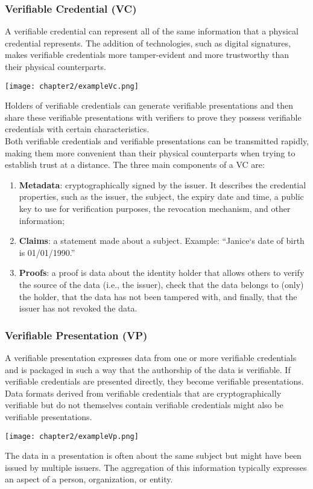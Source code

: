 \subsubsection{Verifiable Credential (VC)}
A verifiable credential can represent all of the same information that a physical 
credential represents. The addition of technologies, such as digital signatures, 
makes verifiable credentials more tamper-evident and more trustworthy than their 
physical counterparts.\\
\begin{center}
    \vspace*{-0.5cm}
    \texttt{[image: chapter2/exampleVc.png]}
\end{center}
Holders of verifiable credentials can generate verifiable presentations and then share 
these verifiable presentations with verifiers to prove they possess verifiable 
credentials with certain characteristics.\\
Both verifiable credentials and verifiable presentations can be transmitted rapidly, 
making them more convenient than their physical counterparts when trying to establish 
trust at a distance.
The three main components of a VC are:
\begin{enumerate}
    \item \textbf{Metadata}: cryptographically signed by the issuer. It describes the credential
    properties, such as the issuer, the subject, the expiry date and time, a public key 
    to use for verification purposes, the revocation mechanism, and other information;
    \item \textbf{Claims}: a statement made about a subject. Example: “Janice`s date of 
    birth is 01/01/1990.”
    \item \textbf{Proofs}: a proof is data about the identity holder that allows others 
    to verify the source of the data (i.e., the issuer), check that the data belongs to 
    (only) the holder, that the data has not been tampered with, and finally, that the 
    issuer has not revoked the data.
\end{enumerate}

\subsubsection{Verifiable Presentation (VP)}
A verifiable presentation expresses data from one or more verifiable credentials and is 
packaged in such a way that the authorship of the data is verifiable. If verifiable 
credentials are presented directly, they become verifiable presentations. Data formats 
derived from verifiable credentials that are cryptographically verifiable but do not 
themselves contain verifiable credentials might also be verifiable presentations.
\begin{center}
    \texttt{[image: chapter2/exampleVp.png]}
\end{center}
The data in a presentation is often about the same subject but might have been issued by 
multiple issuers. The aggregation of this information typically expresses an aspect of 
a person, organization, or entity.

